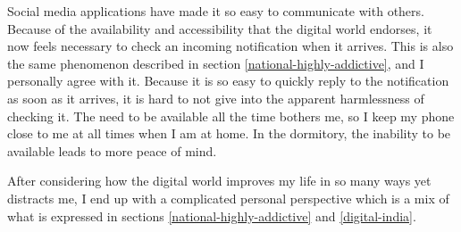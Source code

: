 \documentclass[a4paper, 11pt]{article}
\begin{document}
Social media applications have made it so easy to communicate with others. Because of the availability and accessibility that the digital world endorses, it now feels necessary to check an incoming notification when it arrives. This is also the same phenomenon described in section \ref{national-highly-addictive}, and I personally agree with it. Because it is so easy to quickly reply to the notification as soon as it arrives, it is hard to not give into the apparent harmlessness of checking it. The need to be available all the time bothers me, so I keep my phone close to me at all times when I am at home. In the dormitory, the inability to be available leads to more peace of mind.

After considering how the digital world improves my life in so many ways yet distracts me, I end up with a complicated personal perspective which is a mix of what is expressed in sections \ref{national-highly-addictive} and \ref{digital-india}.
\end{document}

